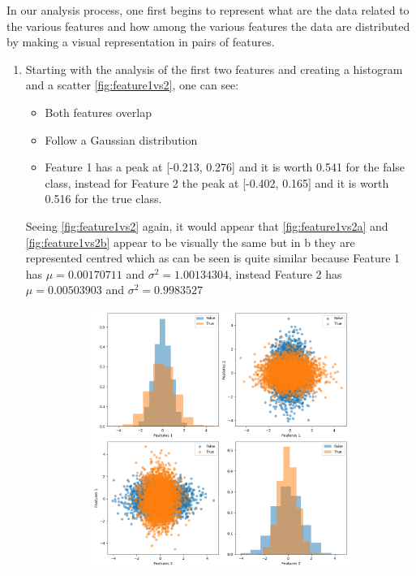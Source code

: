 
In our analysis process, one first begins to represent what are the data related to the various features
and how among the various features the data are distributed by making a visual representation in pairs of features.

\begin{enumerate}
    \item Starting with the analysis of the first two features and creating a histogram and a scatter
    \autoref{fig:feature1vs2}, one can see:
    \begin{itemize}
        \item Both features overlap
        \item Follow a Gaussian distribution
        \item Feature 1 has a peak at [-0.213, 0.276] and it is worth 0.541 for the false class, instead for Feature 2
        the peak at [-0.402, 0.165] and it is worth 0.516 for the true class.
    \end{itemize}
    Seeing \autoref{fig:feature1vs2} again, it would appear that \autoref{fig:feature1vs2a} and
    \autoref{fig:feature1vs2b} appear to be visually the same but in b they are represented centred
    which as can be seen is quite similar because Feature 1 has \(\mu = 0.00170711\)
    and \(\sigma^2 = 1.00134304\), instead Feature 2 has \(\mu = 0.00503903\) and \(\sigma^2 =  0.9983527\)
    \begin{figure}[h!]
        \centering
        \begin{subfigure}[b]{0.4\linewidth}
            \includegraphics[width=\linewidth]{Lab/02. Lab 02/Images/01. Graphics Features 1_2 Without Mean}

\end{subfigure}
\end{figure}
\end{enumerate}
